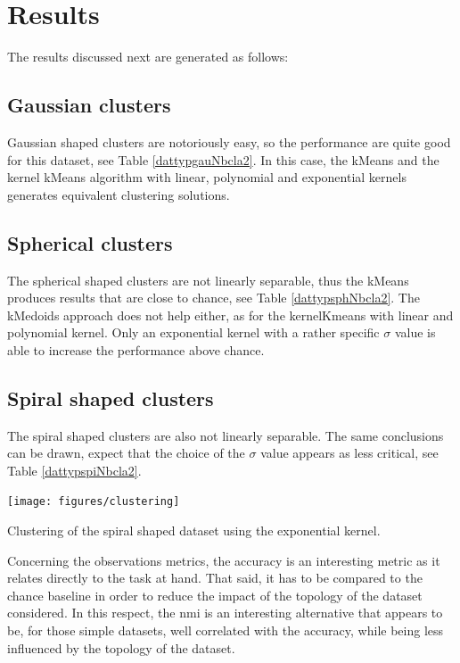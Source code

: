 \documentclass[12pt,a4paper,fleqn]{tufte-handout}
\begin{document}
\section{Results}

The results discussed next are generated as follows:


\subsection{Gaussian clusters}

Gaussian shaped clusters are notoriously easy, so the performance are quite good for this dataset, see Table \ref{dattypgauNbcla2}. In this case, the kMeans and the kernel kMeans algorithm with linear, polynomial and exponential kernels generates equivalent clustering solutions.

\subsection{Spherical clusters}

The spherical shaped clusters are not linearly separable, thus the kMeans produces results that are close to chance, see Table \ref{dattypsphNbcla2}. The kMedoids approach does not help either, as for the kernelKmeans with linear and polynomial kernel. Only an exponential kernel with a rather specific $\sigma$ value is able to increase the performance above chance.

\subsection{Spiral shaped clusters}

The spiral shaped clusters are also not linearly separable. The same conclusions can be drawn, expect that the choice of the $\sigma$ value appears as less critical, see Table \ref{dattypspiNbcla2}.


\begin{marginfigure}
\texttt{[image: figures/clustering]}
\caption{Clustering of the spiral shaped dataset using the exponential kernel.}
\label{clustering}
\end{marginfigure}

Concerning the observations metrics, the accuracy is an interesting metric as it relates directly to the task at hand. That said, it has to be compared to the chance baseline in order to reduce the impact of the topology of the dataset considered. In this respect, the nmi is an interesting alternative that appears to be, for those simple datasets, well correlated with the accuracy, while being less influenced by the topology of the dataset.
\end{document}
